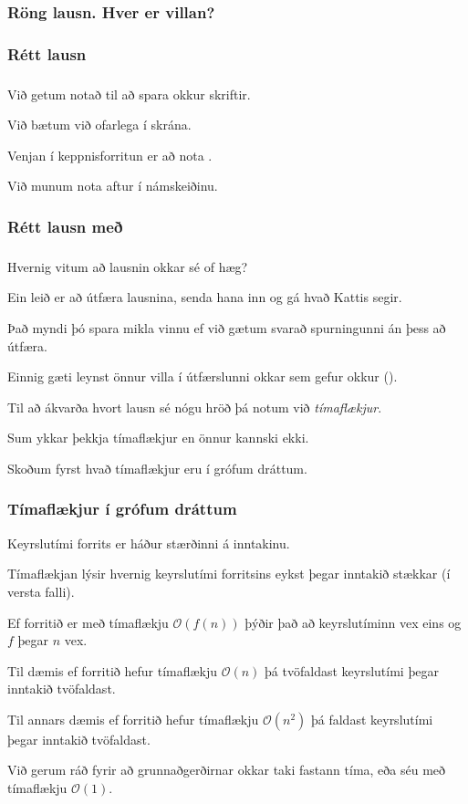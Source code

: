 {
	\frametitle{Röng lausn. Hver er villan?}
}

{
	\frametitle{Rétt lausn}
}

{
	\frametitle{}
	{
		\item<1-> Við getum notað  til að spara okkur skriftir.
		\item<2-> Við bætum við  ofarlega í skrána.
		\item<3-> Venjan í keppnisforritun er að nota .
		\item<4-> Við munum nota  aftur í námskeiðinu.
	}
}

{
	\frametitle{Rétt lausn með }
}

{
	\frametitle{}
	{
		\item<1-> Hvernig vitum að lausnin okkar sé of hæg?
		\item<2-> Ein leið er að útfæra lausnina, senda hana inn og gá hvað Kattis segir.
		\item<3-> Það myndi þó spara mikla vinnu ef við gætum svarað spurningunni án þess að útfæra.
		\item<4-> Einnig gæti leynst önnur villa í útfærslunni okkar sem gefur okkur  ().
		\item<5-> Til að ákvarða hvort lausn sé nógu hröð þá notum við \emph{tímaflækjur}.
		\item<6-> Sum ykkar þekkja tímaflækjur en önnur kannski ekki.
		\item<7-> Skoðum fyrst hvað tímaflækjur eru í grófum dráttum.
	}
}

{
	\frametitle{Tímaflækjur í grófum dráttum}
	{
		\item<1-> Keyrslutími forrits er háður stærðinni á inntakinu.
		\item<2-> Tímaflækjan lýsir hvernig keyrslutími forritsins eykst þegar inntakið stækkar (í versta falli).
		\item<3-> Ef forritið er með tímaflækju $\mathcal{O}(f(n))$ þýðir það að keyrslutíminn vex eins og $f$ þegar $n$ vex.
		\item<4-> Til dæmis ef forritið hefur tímaflækju $\mathcal{O}(n)$ þá tvöfaldast keyrslutími þegar inntakið tvöfaldast.
		\item<5-> Til annars dæmis ef forritið hefur tímaflækju $\mathcal{O}(n^2)$ þá faldast keyrslutími þegar inntakið tvöfaldast.
		\item<7-> Við gerum ráð fyrir að grunnaðgerðirnar okkar taki fastann tíma, eða séu með tímaflækju $\mathcal{O}(1)$.
	}
}

